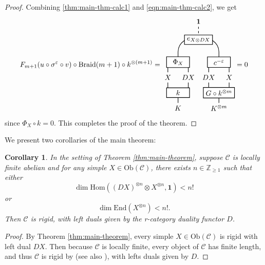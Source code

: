 \documentclass[11pt, reqno]{amsart}
\newtheorem{cor}[thm]{Corollary}
\theoremstyle{definition}\newtheorem{defi}[thm]{Definition}
\theoremstyle{definition}\newtheorem{rem}[thm]{Remark}
\theoremstyle{definition}\newtheorem{exam}[thm]{Example}
\theoremstyle{definition}\newtheorem{assum}[thm]{Assumption}
\newcommand{\cC}{\mathcal{C}}
\newcommand{\ZZ}{\mathbb{Z}}
\newcommand{\vac}{\mathbf{1}}
\begin{document}
\begin{proof}
    Combining \eqref{thm:main-thm-calc1} and \eqref{eqn:main-thm-calc2}, we get
\begin{equation*}
F_{m+1}(u\circ\sigma^\varepsilon\circ v)\circ\mathrm{Braid}(m+1)\circ k^{\otimes (m+1)} =    \begin{matrix}
    \begin{tikzpicture}[scale = 1, baseline = {(current bounding box.center)}, line width=0.75pt]
    \node at (.5,-.25) {$K$};
    \node at (2.5,-.25) {$K^{\otimes m}$};
    \node at (0,1.25) {$X$};
    \node at (1,1.25) {$DX$};
    \node at (2,1.25) {$DX$}; 
    \node at (3,1.25) {$X$};
    \draw (.5,0) -- (.5,.5);
    \draw (2.5,0) -- (2.5,.5);
    \draw (0,1.5) -- (0,2);
    \draw (1,1.5) -- (1,2);
    \draw (2,1.5) -- (2,2);
    \draw (3,1.5) -- (3,2);
     \draw (0,.5) -- (0,1);
    \draw (1,.5) -- (1,1);
    \draw (2,.5) -- (2,1);
    \draw (3,.5) -- (3,1);
    \draw[dashed] (1.5,3) -- (1.5,3.75);
  \draw (.5, 2) -- (.5,2.5) .. controls (.5, 3.5) and (2.5,3.5) .. (2.5,2.5) -- (2.5, 2);
     \node at (2.5,.5) [draw,minimum width=32pt,minimum height=10pt,thick, fill=white] {$G\circ k^{\otimes m}$};
     \node at (.5,.5) [draw,minimum width=32pt,minimum height=10pt,thick, fill=white] {$k$};
    \node at (2.5,2) [draw,minimum width=32pt,minimum height=10pt,thick, fill=white] {$c^{-\varepsilon}$};
     \node at (.5,2) [draw,minimum width=32pt,minimum height=10pt,thick, fill=white] {$\Phi_X$};
      \node at (1.5,3.1) [draw,minimum width=20pt,minimum height=10pt,thick, fill=white] {$e_{X\otimes DX}$};
     \node at (1.5,4) {$\vac$};
    \end{tikzpicture}
    \end{matrix} =0
\end{equation*}
since $\Phi_X\circ k =0$. This completes the proof of the theorem.
\end{proof}

We present two corollaries of the main theorem:
\begin{cor}\label{cor:loc-fin}
In the setting of Theorem \ref{thm:main-theorem}, suppose $\cC$ is locally finite abelian and for any simple $X\in\mathrm{Ob}(\cC)$, there exists $n\in\ZZ_{\geq 1}$ such that either
\begin{equation*}
\dim\mathrm{Hom}((DX)^{\otimes n}\otimes X^{\otimes n},\vac)<n!
\end{equation*}
or
\begin{equation*}
\dim\mathrm{End}(X^{\otimes n})<n!.
\end{equation*}
Then $\cC$ is rigid, with left duals given by the r-category duality functor $D$.
\end{cor}
\begin{proof}
By Theorem \ref{thm:main-theorem}, every simple $X\in\mathrm{Ob}(\cC)$ is rigid with left dual $DX$. Then because $\cC$ is locally finite, every object of $\cC$ has finite length, and thus $\cC$ is rigid by \cite[Theorem 3.13]{CMSY} (see also \cite[Theorem 4.4.1]{CMY2}), with lefts duals given by $D$.
\end{proof}
\end{document}
